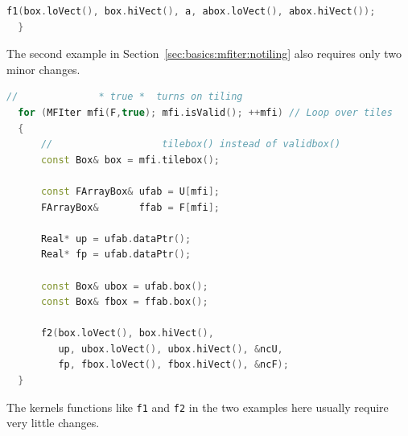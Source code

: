 {{\begin{lstlisting}[language=cpp]
      f1(box.loVect(), box.hiVect(), a, abox.loVect(), abox.hiVect());
  }
\end{lstlisting}
The second example in Section~\ref{sec:basics:mfiter:notiling} also
requires only two minor changes.
\begin{lstlisting}[language=cpp]
  //              * true *  turns on tiling  
  for (MFIter mfi(F,true); mfi.isValid(); ++mfi) // Loop over tiles
  {
      //                   tilebox() instead of validbox()
      const Box& box = mfi.tilebox();

      const FArrayBox& ufab = U[mfi];
      FArrayBox&       ffab = F[mfi];

      Real* up = ufab.dataPtr();
      Real* fp = ufab.dataPtr();

      const Box& ubox = ufab.box();
      const Box& fbox = ffab.box();

      f2(box.loVect(), box.hiVect(),
         up, ubox.loVect(), ubox.hiVect(), &ncU,
         fp, fbox.loVect(), fbox.hiVect(), &ncF);
  }
\end{lstlisting}
The kernels functions like {\tt f1} and {\tt f2} in the two examples
here usually require very little changes.

}}

